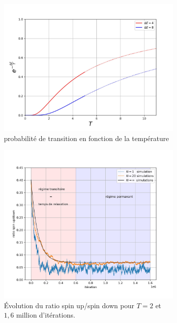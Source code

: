 \documentclass[11pt, parskip=half]{scrartcl} %
\begin{document}
\begin{figure}[h]
	\begin{subfigure}[c]{0.5\textwidth}
		\centering
		\includegraphics[width=0.95\linewidth]{./figures/proba.jpg}
		\caption{probabilité de transition en fonction de la température}
		\label{fig:H}
	\end{subfigure}
	\begin{subfigure}[c]{0.5\textwidth}		
		\centering
		\includegraphics[width=0.95\linewidth]{./figures/simulation_ising.jpg}
		\caption{Évolution du ratio spin up/spin down pour $T=2$ et $1,6$ million d'itérations.}
		\label{fig:H}
	\end{subfigure}
	\caption{}
\end{figure}
\end{document}
